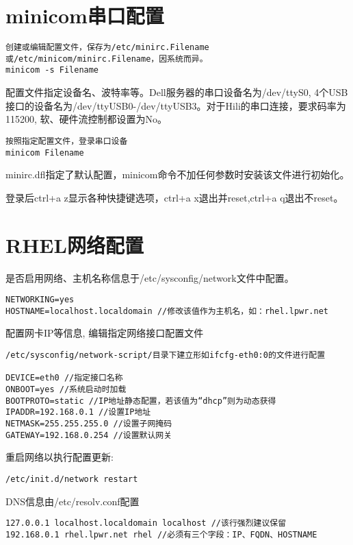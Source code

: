 \section{minicom串口配置}

\begin{verbatim}
创建或编辑配置文件，保存为/etc/minirc.Filename或/etc/minicom/minirc.Filename，因系统而异。
minicom -s Filename
\end{verbatim}
配置文件指定设备名、波特率等。Dell服务器的串口设备名为/dev/ttyS0, 4个USB接口的设备名为/dev/ttyUSB0-/dev/ttyUSB3。对于Hili的串口连接，要求码率为115200, 软、硬件流控制都设置为No。



\begin{verbatim}
按照指定配置文件，登录串口设备
minicom Filename
\end{verbatim}


minirc.dfl指定了默认配置，minicom命令不加任何参数时安装该文件进行初始化。

登录后ctrl+a z显示各种快捷键选项，ctrl+a x退出并reset,ctrl+a q退出不reset。


\section{RHEL网络配置}


是否启用网络、主机名称信息于/etc/sysconfig/network文件中配置。
\begin{verbatim}
NETWORKING=yes
HOSTNAME=localhost.localdomain //修改该值作为主机名，如：rhel.lpwr.net
\end{verbatim}

配置网卡IP等信息, 编辑指定网络接口配置文件
\begin{verbatim}
/etc/sysconfig/network-script/目录下建立形如ifcfg-eth0:0的文件进行配置

DEVICE=eth0 //指定接口名称
ONBOOT=yes //系统启动时加载
BOOTPROTO=static //IP地址静态配置，若该值为“dhcp”则为动态获得
IPADDR=192.168.0.1 //设置IP地址
NETMASK=255.255.255.0 //设置子网掩码
GATEWAY=192.168.0.254 //设置默认网关
\end{verbatim}

重启网络以执行配置更新:

\begin{verbatim}
/etc/init.d/network restart
\end{verbatim}

DNS信息由/etc/resolv.conf配置
\begin{verbatim}
127.0.0.1 localhost.localdomain localhost //该行强烈建议保留
192.168.0.1 rhel.lpwr.net rhel //必须有三个字段：IP、FQDN、HOSTNAME
\end{verbatim}


